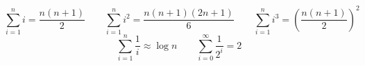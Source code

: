 $$ \sum_{i=1}^{n} i = \dfrac{n(n+1)}{2} \qquad \sum_{i=1}^{n} i^{2} = \frac{n(n+1)(2n+1)}{6} \qquad \sum_{i=1}^{n} i^{3} = \left( \dfrac{n(n + 1)}{2} \right)^2 $$
$$ \sum_{i=1}^{n} \dfrac{1}{i} \approx \log{n} \qquad \sum_{i=0}^{\infty} \dfrac{1}{2^i} = 2 $$